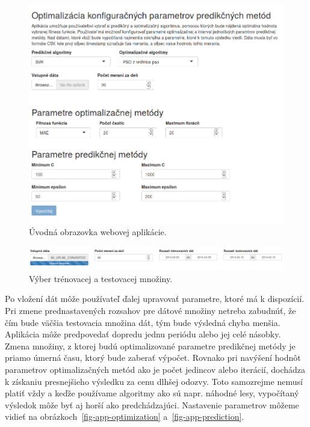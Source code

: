 \documentclass[a4paper,slovak,12pt,appendix]{article}
\begin{document}
\begin{figure}[H]
  \centering
  \includegraphics[width=\textwidth]{app_welcome.png}
  \caption{Úvodná obrazovka webovej aplikácie.}
  \label{fig-app-screen}
\end{figure}

\begin{figure}[H]
  \centering
  \includegraphics[width=\textwidth]{app_data.png}
  \caption{Výber trénovacej a testovacej množiny.}
  \label{fig-app-data}
\end{figure}

Po vložení dát môže používateľ ďalej upravovať parametre, ktoré má k dispozícií.
Pri zmene prednastavených rozsahov pre dátové množiny netreba zabudnúť, že čím
bude väčšia testovacia množina dát, tým bude výsledná chyba menšia. Aplikácia
môže predpovedať dopredu jednu periódu alebo jej celé násobky. Zmena množiny,
z ktorej budú optimalizované parametre predikčnej metódy je priamo úmerná
času, ktorý bude zaberať výpočet. Rovnako pri navýšení hodnôt parametrov
optimalizačných metód ako je počet jedincov alebo iterácií, dochádza k získaniu
presnejšieho výsledku za cenu dlhšej odozvy. Toto samozrejme nemusí platiť vždy
a keďže používame algoritmy ako sú napr. náhodné lesy, vypočítaný výsledok môže
byť aj horší ako predchádzajúci. Nastavenie parametrov môžeme vidieť na
obrázkoch~\ref{fig-app-optimization} a~\ref{fig-app-prediction}.
\end{document}
